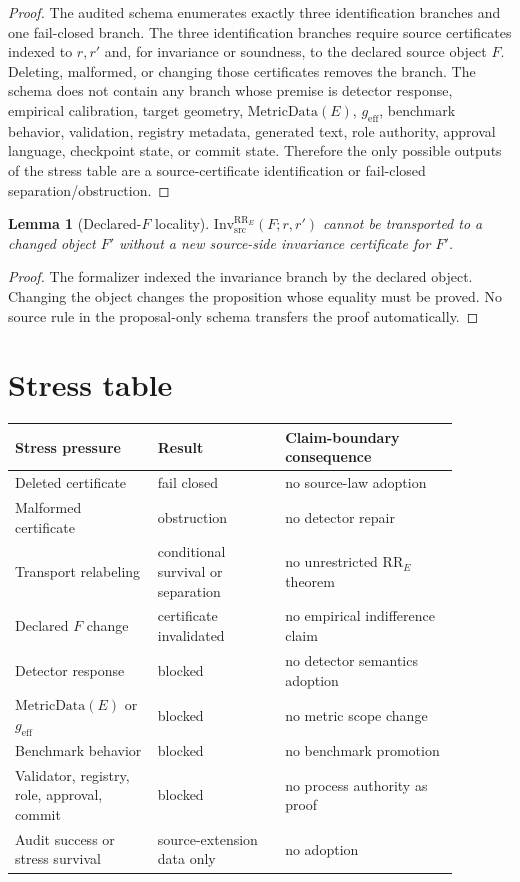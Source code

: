 \documentclass[11pt]{article}
\newcommand{\RRE}{\mathrm{RR}_{E}}
\newcommand{\InvRR}{\mathrm{Inv}^{\RRE}_{\mathrm{src}}}
\newcommand{\MetricData}{\mathrm{MetricData}}
\newcommand{\geff}{g_{\mathrm{eff}}}
\newtheorem{lemma}{Lemma}
\begin{document}
\begin{proof}
The audited schema enumerates exactly three identification branches and one
fail-closed branch. The three identification branches require source
certificates indexed to \(r,r'\) and, for invariance or soundness, to the
declared source object \(F\). Deleting, malformed, or changing those
certificates removes the branch. The schema does not contain any branch whose
premise is detector response, empirical calibration, target geometry,
\(\MetricData(E)\), \(\geff\), benchmark behavior, validation, registry
metadata, generated text, role authority, approval language, checkpoint state,
or commit state. Therefore the only possible outputs of the stress table are a
source-certificate identification or fail-closed separation/obstruction.
\end{proof}

\begin{lemma}[Declared-\(F\) locality]
\(\InvRR(F;r,r')\) cannot be transported to a changed object \(F'\) without a
new source-side invariance certificate for \(F'\).
\end{lemma}

\begin{proof}
The formalizer indexed the invariance branch by the declared object. Changing
the object changes the proposition whose equality must be proved. No source
rule in the proposal-only schema transfers the proof automatically.
\end{proof}

\section{Stress table}

\begin{longtable}{p{0.29\linewidth}p{0.25\linewidth}p{0.34\linewidth}}
\toprule
Stress pressure & Result & Claim-boundary consequence \\
\midrule
Deleted certificate & fail closed & no source-law adoption \\
Malformed certificate & obstruction & no detector repair \\
Transport relabeling & conditional survival or separation & no unrestricted \(\RRE\) theorem \\
Declared \(F\) change & certificate invalidated & no empirical indifference claim \\
Detector response & blocked & no detector semantics adoption \\
\(\MetricData(E)\) or \(\geff\) & blocked & no metric scope change \\
Benchmark behavior & blocked & no benchmark promotion \\
Validator, registry, role, approval, commit & blocked & no process authority as proof \\
Audit success or stress survival & source-extension data only & no adoption \\
\bottomrule
\end{longtable}
\end{document}
